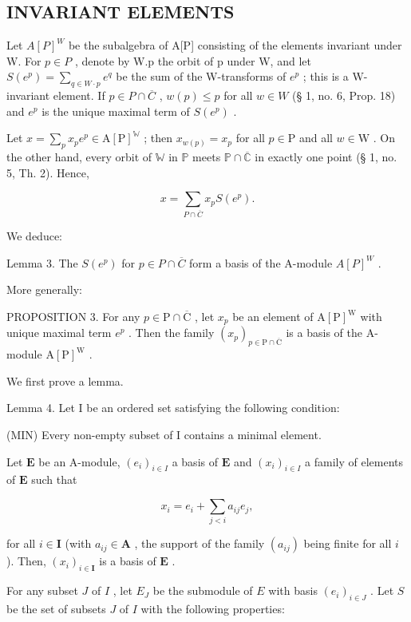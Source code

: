 \subsection{INVARIANT ELEMENTS}

Let \(A[P]^W\) be the subalgebra of A{[}P{]} consisting of the elements invariant under W. For \(p \in P\) , denote by W.p the orbit of p under W, and let \(S(e^p) = \sum_{q \in W \cdot p} e^q\) be the sum of the W-transforms of \(e^p\) ; this is a W-invariant element. If \(p \in P \cap \overline{C}\) , \(w(p) \leqslant p\) for all \(w \in W\) (§ 1, no. 6, Prop. 18) and \(e^p\) is the unique maximal term of \(S(e^p)\) .

Let \(x = \sum_{p} x_{p} e^{p} \in \mathrm{A}[\mathrm{P}]^{\mathbb{W}}\) ; then \(x_{w(p)} = x_{p}\) for all \(p \in \mathrm{P}\) and all \(w \in \mathrm{W}\) . On the other hand, every orbit of \(\mathbb{W}\) in \(\mathbb{P}\) meets \(\mathbb{P} \cap \overline{\mathbb{C}}\) in exactly one point (§ 1, no. 5, Th. 2). Hence,

\[
x = \sum_ {P \cap \overline {{C}}} x _ {p} S (e ^ {p}).\tag{6}
\]

We deduce:

Lemma 3. The \(S(e^p)\) for \(p \in P \cap \overline{C}\) form a basis of the A-module \(A[P]^W\) .

More generally:

PROPOSITION 3. For any \(p \in \mathrm{P} \cap \overline{\mathrm{C}}\) , let \(x_p\) be an element of \(\mathrm{A}[\mathrm{P}]^{\mathrm{W}}\) with unique maximal term \(e^p\) . Then the family \((x_p)_{p \in \mathrm{P} \cap \overline{\mathrm{C}}}\) is a basis of the A-module \(\mathrm{A}[\mathrm{P}]^{\mathrm{W}}\) .

We first prove a lemma.

Lemma 4. Let I be an ordered set satisfying the following condition:

(MIN) Every non-empty subset of I contains a minimal element.

Let \(\mathbf{E}\) be an A-module, \((e_i)_{i \in I}\) a basis of \(\mathbf{E}\) and \((x_i)_{i \in I}\) a family of elements of \(\mathbf{E}\) such that

\[
x _ {i} = e _ {i} + \sum_ {j <   i} a _ {i j} e _ {j},
\]

for all \(i \in \mathbf{I}\) (with \(a_{ij} \in \mathbf{A}\) , the support of the family \((a_{ij})\) being finite for all \(i\) ). Then, \((x_i)_{i \in \mathbf{I}}\) is a basis of \(\mathbf{E}\) .

For any subset \(J\) of \(I\) , let \(E_J\) be the submodule of \(E\) with basis \((e_i)_{i \in J}\) . Let \(S\) be the set of subsets \(J\) of \(I\) with the following properties:

